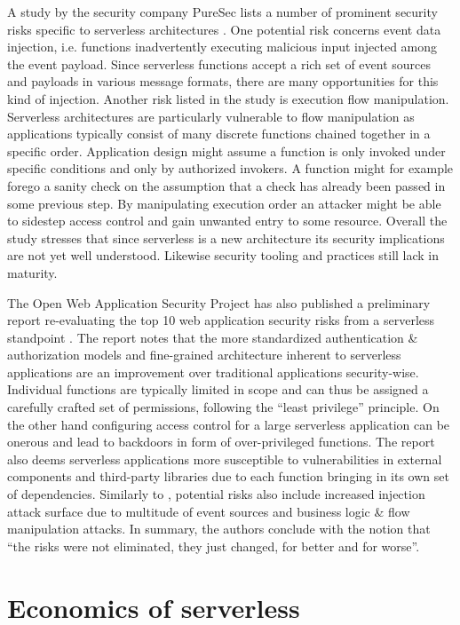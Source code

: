 A study by the security company PureSec lists a number of prominent security risks specific to serverless architectures \parencite{segal18risks}. One potential risk concerns event data injection, i.e. functions inadvertently executing malicious input injected among the event payload. Since serverless functions accept a rich set of event sources and payloads in various message formats, there are many opportunities for this kind of injection. Another risk listed in the study is execution flow manipulation. Serverless architectures are particularly vulnerable to flow manipulation as applications typically consist of many discrete functions chained together in a specific order. Application design might assume a function is only invoked under specific conditions and only by authorized invokers. A function might for example forego a sanity check on the assumption that a check has already been passed in some previous step. By manipulating execution order an attacker might be able to sidestep access control and gain unwanted entry to some resource. Overall the study stresses that since serverless is a new architecture its security implications are not yet well understood. Likewise security tooling and practices still lack in maturity.

The Open Web Application Security Project has also published a preliminary report re-evaluating the top 10 web application security risks from a serverless standpoint \parencite{owasp18top10}. The report notes that the more standardized authentication \& authorization models and fine-grained architecture inherent to serverless applications are an improvement over traditional applications security-wise. Individual functions are typically limited in scope and can thus be assigned a carefully crafted set of permissions, following the ``least privilege'' principle. On the other hand configuring access control for a large serverless application can be onerous and lead to backdoors in form of over-privileged functions. The report also deems serverless applications more susceptible to vulnerabilities in external components and third-party libraries due to each function bringing in its own set of dependencies. Similarly to \textcite{segal18risks}, potential risks also include increased injection attack surface due to multitude of event sources and business logic \& flow manipulation attacks. In summary, the authors conclude with the notion that ``the risks were not eliminated, they just changed, for better and for worse''.

\section{Economics of serverless} \label{sec:economics}

